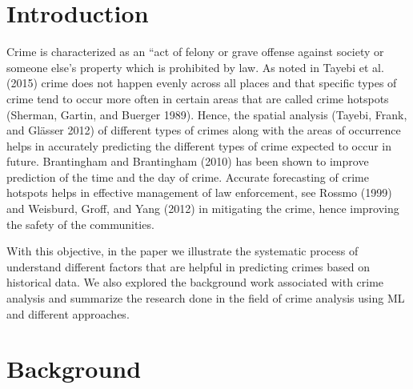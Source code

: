 \documentclass[conference,final,]{IEEEtran}
\begin{document}
\maketitle


%
\IEEEpeerreviewmaketitle


\section{Introduction}\label{introduction}

Crime is characterized as an ``act of felony or grave offense against
society or someone else's property which is prohibited by law. As noted
in Tayebi et al. (2015) crime does not happen evenly across all places
and that specific types of crime tend to occur more often in certain
areas that are called crime hotspots (Sherman, Gartin, and Buerger
1989). Hence, the spatial analysis (Tayebi, Frank, and Glässer 2012) of
different types of crimes along with the areas of occurrence helps in
accurately predicting the different types of crime expected to occur in
future. Brantingham and Brantingham (2010) has been shown to improve
prediction of the time and the day of crime. Accurate forecasting of
crime hotspots helps in effective management of law enforcement, see
Rossmo (1999) and Weisburd, Groff, and Yang (2012) in mitigating the
crime, hence improving the safety of the communities.

With this objective, in the paper we illustrate the systematic process
of understand different factors that are helpful in predicting crimes
based on historical data. We also explored the background work associated
with crime analysis and summarize the research done in the field of
crime analysis using ML and different approaches.

\section{Background}\label{background}
\end{document}
